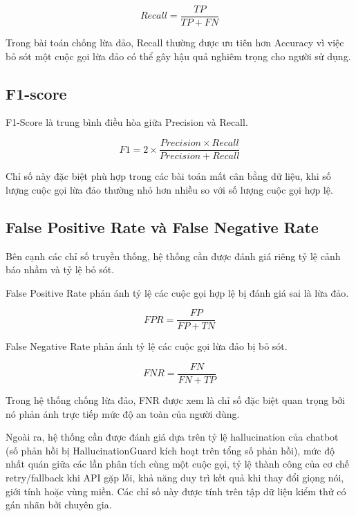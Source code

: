 \[Recall=\frac{TP}{TP+FN}\]

Trong bài toán chống lừa đảo, Recall thường được ưu tiên hơn Accuracy vì việc bỏ sót một cuộc gọi lừa đảo có thể gây hậu quả nghiêm trọng cho người sử dụng.

\subsection{F1-score}
F1-Score là trung bình điều hòa giữa Precision và Recall.

\[F1=2\times\frac{Precision\times Recall}{Precision+Recall}\]

Chỉ số này đặc biệt phù hợp trong các bài toán mất cân bằng dữ liệu, khi số lượng cuộc gọi lừa đảo thường nhỏ hơn nhiều so với số lượng cuộc gọi hợp lệ.

\subsection{False Positive Rate và False Negative Rate}
Bên cạnh các chỉ số truyền thống, hệ thống cần được đánh giá riêng tỷ lệ cảnh báo nhầm và tỷ lệ bỏ sót.

False Positive Rate phản ánh tỷ lệ các cuộc gọi hợp lệ bị đánh giá sai là lừa đảo.

\[FPR=\frac{FP}{FP+TN}\]

False Negative Rate phản ánh tỷ lệ các cuộc gọi lừa đảo bị bỏ sót.

\[FNR=\frac{FN}{FN+TP}\]

Trong hệ thống chống lừa đảo, FNR được xem là chỉ số đặc biệt quan trọng bởi nó phản ánh trực tiếp mức độ an toàn của người dùng.

Ngoài ra, hệ thống cần được đánh giá dựa trên tỷ lệ hallucination của chatbot (số phản hồi bị HallucinationGuard kích hoạt trên tổng số phản hồi), mức độ nhất quán giữa các lần phân tích cùng một cuộc gọi, tỷ lệ thành công của cơ chế retry/fallback khi API gặp lỗi, khả năng duy trì kết quả khi thay đổi giọng nói, giới tính hoặc vùng miền. Các chỉ số này được tính trên tập dữ liệu kiểm thử có gán nhãn bởi chuyên gia.
